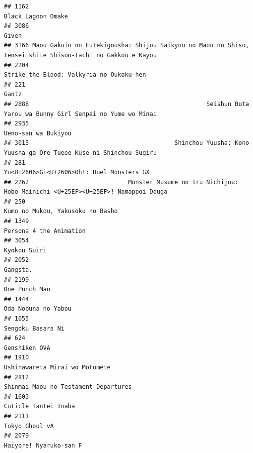 \documentclass[
]{article}
\begin{document}
\begin{verbatim}
## 1162                                                                                        Black Lagoon Omake
## 3086                                                                                                     Given
## 3166 Maou Gakuin no Futekigousha: Shijou Saikyou no Maou no Shiso, Tensei shite Shison-tachi no Gakkou e Kayou
## 2204                                                                  Strike the Blood: Valkyria no Oukoku-hen
## 221                                                                                                      Gantz
## 2888                                                  Seishun Buta Yarou wa Bunny Girl Senpai no Yume wo Minai
## 2935                                                                                       Ueno-san wa Bukiyou
## 3015                                         Shinchou Yuusha: Kono Yuusha ga Ore Tueee Kuse ni Shinchou Sugiru
## 281                                                                  Yu<U+2606>Gi<U+2606>Oh!: Duel Monsters GX
## 2262                            Monster Musume no Iru Nichijou: Hobo Mainichi <U+25EF><U+25EF>! Namappoi Douga
## 250                                                                           Kumo no Mukou, Yakusoku no Basho
## 1349                                                                                   Persona 4 the Animation
## 3054                                                                                              Kyokou Suiri
## 2052                                                                                                  Gangsta.
## 2199                                                                                             One Punch Man
## 1444                                                                                       Oda Nobuna no Yabou
## 1055                                                                                         Sengoku Basara Ni
## 624                                                                                              Genshiken OVA
## 1910                                                                            Ushinawareta Mirai wo Motomete
## 2812                                                                      Shinmai Maou no Testament Departures
## 1603                                                                                      Cuticle Tantei Inaba
## 2111                                                                                            Tokyo Ghoul vA
## 2079                                                                                    Haiyore! Nyaruko-san F

\end{verbatim}
\end{document}

